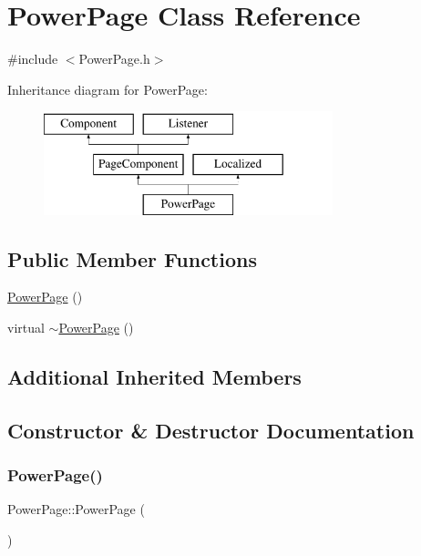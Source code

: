 \hypertarget{classPowerPage}{}\section{Power\+Page Class Reference}
\label{classPowerPage}


{\ttfamily \#include $<$Power\+Page.\+h$>$}

Inheritance diagram for Power\+Page\+:\begin{figure}[H]
\begin{center}
\leavevmode
\includegraphics[height=3.000000cm]{classPowerPage}
\end{center}
\end{figure}
\subsection*{Public Member Functions}
\begin{DoxyCompactItemize}
\item 
\mbox{\hyperlink{classPowerPage_a837ebc0858e123bf85f724c75fe3fbd2}{Power\+Page}} ()
\item 
virtual \mbox{\hyperlink{classPowerPage_ad02f6913d06fed786a02b79f124dd6d5}{$\sim$\+Power\+Page}} ()
\end{DoxyCompactItemize}
\subsection*{Additional Inherited Members}


\subsection{Constructor \& Destructor Documentation}
\mbox{\label{classPowerPage_a837ebc0858e123bf85f724c75fe3fbd2}} 
\subsubsection{\texorpdfstring{Power\+Page()}{PowerPage()}}
{\footnotesize\ttfamily Power\+Page\+::\+Power\+Page (\begin{DoxyParamCaption}{ }\end{DoxyParamCaption})}

